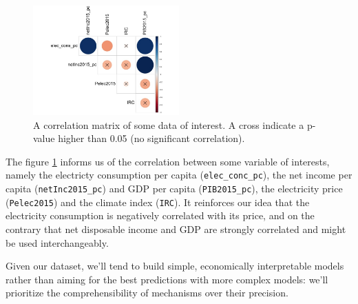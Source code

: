 \begin{figure}[h]
    \centering
    \includegraphics[width=0.5\textwidth, trim={0 0 0 5pt}, clip]{Images/correlation_matrix.jpeg}
        \caption{A correlation matrix of some data of interest. A cross indicate a p-value higher than 0.05 (no significant correlation).}
    \label{corr_mat}
  \end{figure}

The figure \ref{corr_mat} informs us of the correlation between some variable of interests, namely the electricty consumption per capita (\texttt{elec\_conc\_pc}), the net income per capita (\texttt{netInc2015\_pc}) and GDP per capita (\texttt{PIB2015\_pc}), the electricity price (\texttt{Pelec2015}) and the climate index (\texttt{IRC}). It reinforces our idea that the electricity consumption is negatively correlated with its price, and on the contrary that net disposable income and GDP are strongly correlated and might be used interchangeably.

Given our dataset, we'll tend to build simple, economically interpretable models rather than aiming for the best predictions with more complex models: we'll prioritize the comprehensibility of mechanisms over their precision.

